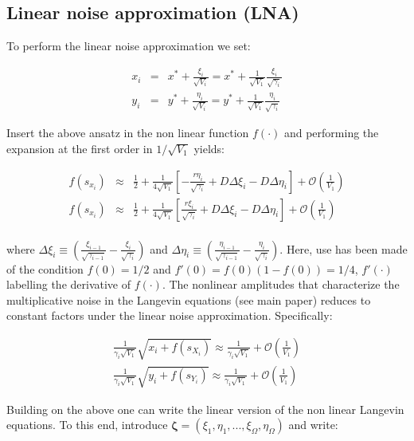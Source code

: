 \documentclass[showpacs,prl,superscriptaddress,nofootinbib, twocolumn]{revtex4}
\begin{document}
\subsection{Linear noise approximation (LNA)}

To perform the linear noise approximation we set:

\begin{eqnarray}
x_i&=&x^*+\frac{\xi_i}{\sqrt{V_i}}=x^*+\frac{1}{\sqrt{V_1}}\frac{\xi_i}{\sqrt{\gamma_i}}\\
y_i&=&y^*+\frac{\eta_i}{\sqrt{V_i}}=y^*+\frac{1}{\sqrt{V_1}}\frac{\eta_i}{\sqrt{\gamma_i}}
\end{eqnarray}

Insert the above ansatz in the non linear function $f(\cdot)$ and performing the expansion at the first order in $1/\sqrt{V_1}$ yields:

\begin{eqnarray*}
f(s_{x_i})&\approx& \frac{1}{2}+\frac{1}{4 \sqrt{V_1}} \left[-\frac{r\eta_i}{\sqrt{\gamma_i}}+D  \Delta \xi_i -D  \Delta \eta_i \right]+  \mathcal{O}(\frac{1}{V_1}) \\
f(s_{x_i})&\approx& \frac{1}{2}+\frac{1}{4 \sqrt{V_1}} \left[\frac{r\xi_i}{\sqrt{\gamma_i}}+D  \Delta \xi_i -D  \Delta \eta_i \right] +   \mathcal{O}(\frac{1}{V_1}) \\
\end{eqnarray*}

where $\Delta \xi_i \equiv (\frac{\xi_{i-1}}{\sqrt{\gamma_{i-1}}}-\frac{\xi_{i}}{\sqrt{\gamma_i}})$ and $\Delta \eta_i \equiv (\frac{\eta_{i-1}}{\sqrt{\gamma_{i-1}}}-\frac{\eta_{i}}{\sqrt{\gamma_i}})$. Here,
use has been made of the condition $f(0)=1/2$ and $f'(0)=f(0)(1-f(0))=1/4$, $f'(\cdot)$ labelling the derivative of $f(\cdot)$.
The nonlinear amplitudes that characterize the multiplicative noise in the Langevin equations (see main paper) reduces to constant factors under the linear noise approximation. Specifically: 

\begin{eqnarray*}
\frac{1}{\gamma_i\sqrt{V_1}}\sqrt{{x}_i+f(s_{X_i})}\approx \frac{1}{\gamma_i\sqrt{V_1}}+\mathcal{O}(\frac{1}{V_1})\\
\frac{1}{\gamma_i\sqrt{V_1}}\sqrt{{y}_i+f(s_{Y_i})}\approx \frac{1}{\gamma_i\sqrt{V_1}}+\mathcal{O}(\frac{1}{V_1})
\end{eqnarray*}

Building on the above one can write the linear version of the non linear Langevin equations. To this end, introduce 
${\boldsymbol \zeta}=(\xi_1,\eta_1, ... , \xi_\Omega, \eta_\Omega)$ and write:  
\end{document}
